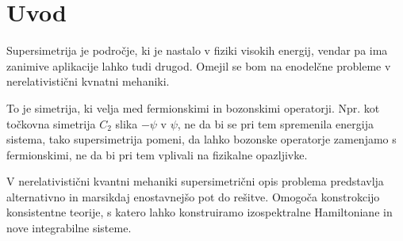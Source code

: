 \section{Uvod}

Supersimetrija je podro\v cje, ki je nastalo v fiziki visokih energij, vendar pa ima zanimive aplikacije lahko
tudi drugod. Omejil se bom na enodel\v cne probleme v nerelativisti\v cni kvnatni mehaniki.

To je simetrija, ki velja med fermionskimi in bozonskimi operatorji. Npr. kot to\v ckovna
simetrija $C_2$ slika $-\psi$ v $\psi$, ne da bi se pri tem spremenila energija sistema, tako supersimetrija pomeni, da lahko bozonske
operatorje zamenjamo s fermionskimi, ne da bi pri tem vplivali na fizikalne opazljivke.

V nerelativisti\v cni kvantni mehaniki supersimetri\v cni opis problema predstavlja alternativno in marsikdaj
enostavnej\v so pot do re\v sitve. Omogo\v ca konstrokcijo konsistentne teorije, s katero lahko konstruiramo izospektralne
Hamiltoniane in nove integrabilne sisteme.


